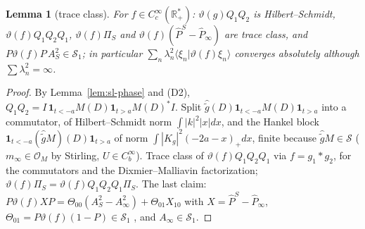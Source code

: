 \documentclass[11pt]{amsart}
\newtheorem{lemma}[theorem]{Lemma}
\theoremstyle{definition}
\theoremstyle{remark}
\newcommand{\R}{\mathbb R}
\begin{document}
\begin{lemma}[trace class]\label{lem:sl-TC}
For $f\in C_c^\infty(\R_+^*)$: $\vartheta(g)Q_1Q_2$ is Hilbert--Schmidt, $\vartheta(f)Q_1Q_2Q_1$, $\vartheta(f)\Pi_S$ and
$\vartheta(f)(\widehat P^S-\widehat P_\infty)$ are trace class, and $P\vartheta(f)P\,A_S^2\in\mathcal S_1$; in particular
$\sum_n\lambda_n^2\langle\xi_n|\vartheta(f)\xi_n\rangle$ converges absolutely although $\sum\lambda_n^2=\infty$.
\end{lemma}
\begin{proof}
By Lemma~\ref{lem:sl-phase} and (D2), $Q_1Q_2=I\,\mathbf 1_{t<-a}M(D)\mathbf 1_{t>a}M(D)^*I$. Split
$\widehat{\tilde g}(D)\mathbf 1_{t<-a}M(D)\mathbf 1_{t>a}$ into a commutator, of Hilbert--Schmidt norm
$\int|k|^2|x|dx$, and the Hankel block $\mathbf 1_{t<-a}(\widehat{\tilde g}M)(D)\mathbf 1_{t>a}$ of norm
$\int|K_g|^2(-2a-x)_+dx$, finite because $\widehat{\tilde g}M\in\mathcal S$ ($m_\infty\in\mathcal O_M$ by Stirling,
$U\in C_b^\infty$). Trace class of $\vartheta(f)Q_1Q_2Q_1$ via $f=g_1*g_2$, \cite[Lemma~D.1]{ConnesConsani2021} for the
commutators and the Dixmier--Malliavin factorization; $\vartheta(f)\Pi_S=\vartheta(f)Q_1Q_2Q_1\Pi_S$.
The last claim: $P\vartheta(f)XP=\Theta_{00}(A_S^2-A_\infty^2)+\Theta_{01}X_{10}$ with $X=\widehat P^S-\widehat P_\infty$,
$\Theta_{01}=P\vartheta(f)(1-P)\in\mathcal S_1$ \cite[Thm.~4.5]{Simon2005}, and $A_\infty\in\mathcal S_1$.
\end{proof}
\end{document}
